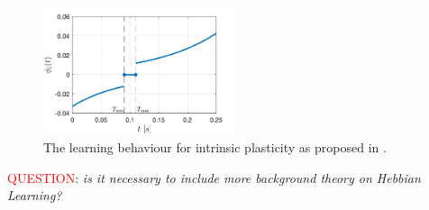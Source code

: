 \begin{figure}[H]
\centering
\includegraphics[width = 0.5\textwidth]{../Figures/Learning/IPlearningFunction.png}
\caption{The learning behaviour for intrinsic plasticity as proposed in \cite{Song2017}.}
\label{fig:IPlearningFunction}
\end{figure}

\textcolor{red}{QUESTION}: \textsl{is it necessary to include more background theory on Hebbian Learning?}

